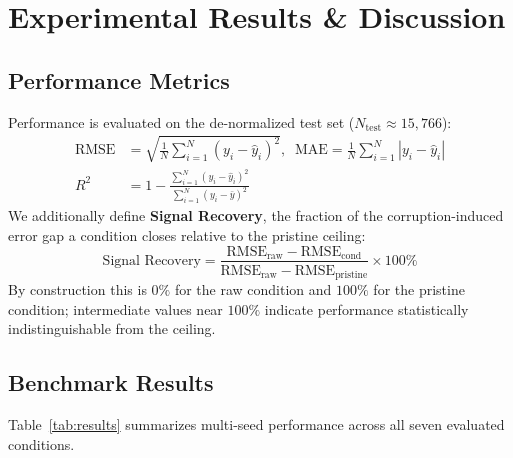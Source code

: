 \documentclass[conference]{IEEEtran}
\begin{document}
\section{Experimental Results \& Discussion}

\subsection{Performance Metrics}
Performance is evaluated on the de-normalized test set ($N_{\text{test}} \approx 15{,}766$):
\begin{align}
\text{RMSE} &= \sqrt{\frac{1}{N}\sum_{i=1}^N (y_i - \hat{y}_i)^2}, \;\;
\text{MAE} = \frac{1}{N}\sum_{i=1}^N |y_i - \hat{y}_i| \\
R^2 &= 1 - \frac{\sum_{i=1}^N (y_i - \hat{y}_i)^2}{\sum_{i=1}^N (y_i - \bar{y})^2}
\end{align}
We additionally define \textbf{Signal Recovery}, the fraction of the corruption-induced error gap a condition closes relative to the pristine ceiling:
\begin{equation}
\text{Signal Recovery} = \frac{\text{RMSE}_{\text{raw}} - \text{RMSE}_{\text{cond}}}{\text{RMSE}_{\text{raw}} - \text{RMSE}_{\text{pristine}}} \times 100\%
\end{equation}
By construction this is $0\%$ for the raw condition and $100\%$ for the pristine condition; intermediate values near $100\%$ indicate performance statistically indistinguishable from the ceiling.

\subsection{Benchmark Results}
Table~\ref{tab:results} summarizes multi-seed performance across all seven evaluated conditions.
\end{document}
